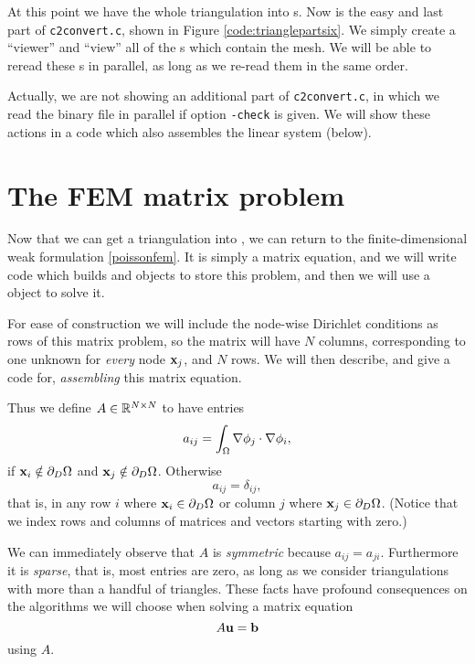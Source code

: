 At this point we have the whole triangulation into \PETSc \pVec s.  Now is the easy and last part of \texttt{c2convert.c}, shown in Figure \ref{code:trianglepartsix}.  We simply create a \PETSc ``viewer'' and ``view'' all of the \pVec s which contain the mesh.  We will be able to reread these \pVec s in parallel, as long as we re-read them in the same order.


Actually, we are not showing an additional part of \texttt{c2convert.c}, in which we read the binary file in parallel if option \texttt{-check} is given.  We will show these actions in a code which also assembles the linear system (below).


\section{The FEM matrix problem}

Now that we can get a triangulation into \PETSc, we can return to the finite-dimensional weak formulation \eqref{poissonfem}.  It is simply a matrix equation, and we will write code which builds \PETSc \pMat and \pVec objects to store this problem, and then we will use a \PETSc \pKSP object to solve it.

For ease of construction we will include the node-wise Dirichlet conditions as rows of this matrix problem, so the matrix will have $N$ columns, corresponding to one unknown for \emph{every} node $\mathbf{x}_j$, and $N$ rows.  We will then describe, and give a code for, \emph{assembling} this matrix equation.

Thus we define $A \in \mathbb{R}^{N\times N}$ to have entries
\begin{equation*}
a_{ij} = \int_\Omega \nabla \phi_j \cdot \nabla \phi_i,
\end{equation*}
if $\mathbf{x}_i \notin \partial_D \Omega$ and $\mathbf{x}_j \notin \partial_D \Omega$.  Otherwise
\begin{equation*}
a_{ij} = \delta_{ij},
\end{equation*}
that is, in any row $i$ where $\mathbf{x}_i \in \partial_D \Omega$ or column $j$ where $\mathbf{x}_j \in \partial_D \Omega$.  (Notice that we index rows and columns of matrices and vectors starting with zero.)

We can immediately observe that $A$ is \emph{symmetric} because $a_{ij}=a_{ji}$.  Furthermore it is \emph{sparse}, that is, most entries are zero, as long as we consider triangulations with more than a handful of triangles.  These facts have profound consequences on the algorithms we will choose when solving a matrix equation
\begin{equation}
A \mathbf{u} = \mathbf{b} \label{poissonmatrix}
\end{equation}
using $A$.

